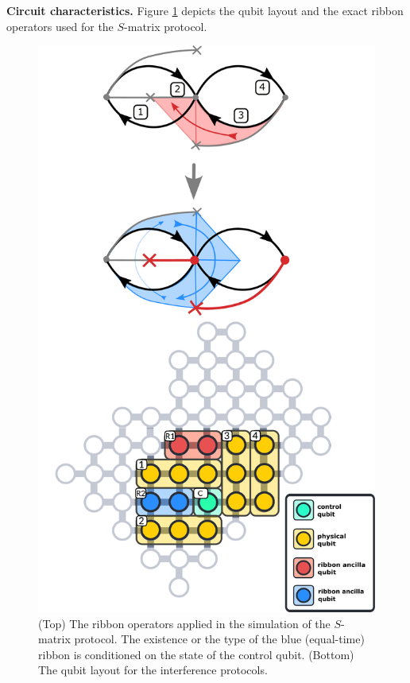 \documentclass[a4paper,twocolumn,11pt, accepted=2024-06-14]{quantumarticle}
\begin{document}
\textbf{Circuit characteristics.}
Figure \ref{fig:intef_setup} depicts the qubit layout and the exact ribbon operators used for the $S$-matrix protocol.
\begin{figure}
	\centering
	\includegraphics[width=\linewidth]{Figures/intef_setup_new.pdf}
	\caption{(Top) The ribbon operators applied in the simulation of the $S$-matrix protocol. The existence or the type of the blue (equal-time) ribbon is conditioned on the state of the control qubit. (Bottom) The qubit layout for the interference protocols.}
	\label{fig:intef_setup}
\end{figure}
\end{document}
